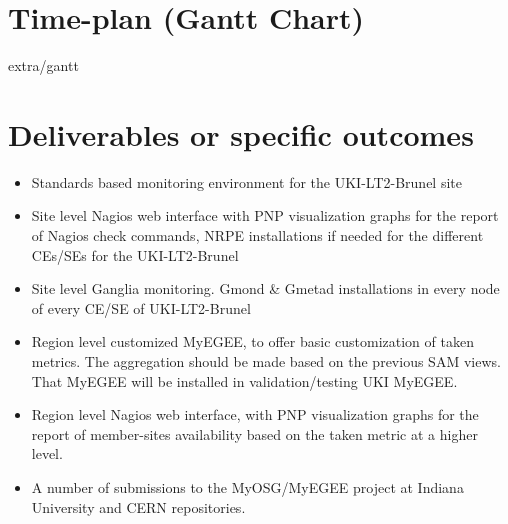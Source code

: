 \section[Time plan]{Time-plan (Gantt Chart)}

 {extra/gantt}
\pagebreak
\section[Deliverables]{Deliverables or specific outcomes}

\begin{itemize}
  \item Standards based monitoring environment for the UKI-LT2-Brunel site
  \item Site level Nagios web interface with PNP visualization graphs for the report of Nagios check commands, NRPE installations if needed for the different CEs/SEs for the UKI-LT2-Brunel
  \item Site level Ganglia monitoring. Gmond \& Gmetad installations in every node of every CE/SE of UKI-LT2-Brunel
  \item Region level customized MyEGEE, to offer basic customization of taken metrics. The aggregation should be made based on the previous SAM views. That MyEGEE will be installed in validation/testing UKI MyEGEE.
  \item Region level Nagios web interface, with PNP visualization graphs for the report of member-sites availability based on the taken metric at a higher level.
  \item A number of submissions to the MyOSG/MyEGEE project at Indiana University and CERN repositories.
\end{itemize}
